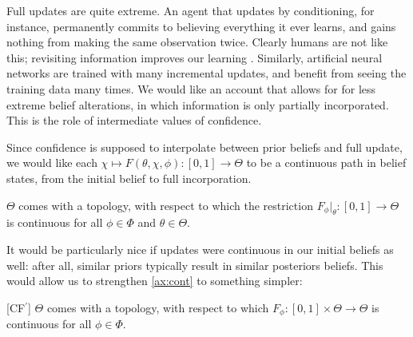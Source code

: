 Full updates are quite extreme.
An agent that updates by conditioning, for instance,
permanently commits to believing everything it ever learns,
and gains nothing from making the same observation twice.
Clearly humans are not like this; revisiting information
 	improves our learning \parencite{ausubel1965effect}.
Similarly, artificial neural networks are trained with
 	many incremental updates, and benefit from seeing 
	the training data many times.
We would like an account that allows for for less extreme belief alterations,
in which information is only partially incorporated.
This is the role of intermediate values of confidence.

Since confidence is supposed to interpolate between prior beliefs and full update,
we would like each $\chi \mapsto F(\theta,\chi,\phi) : [0,1] \to \Theta$
to be a continuous path in belief states, from the initial belief to full incorporation.

\begin{CFaxioms}[nosep]
	\item
	$\Theta$ comes with a topology, with respect to which
	the restriction
	$F_{\phi}|_\theta : [0,1] \to \Theta$
	is continuous
	for all $\phi \in \Phi$ and $\theta \in \Theta$.
	\label{ax:cont}
\end{CFaxioms}



It would be particularly nice if updates were continuous in our initial
beliefs as well: after all, similar priors typically result
in similar posteriors beliefs. This would allow us to strengthen
\cref{ax:cont} to something simpler:

\begin{CFaxioms}[nosep]
	\item
	[CF{\the\numexpr\value{CFaxiomsi}\relax}${^\prime}$]
	$\Theta$ comes with a topology, with respect to which
	$F_\phi : [0,1] \times \Theta \to \Theta$ is continuous
	for all $\phi \in \Phi$.
	\label{ax:cont-strong}
\end{CFaxioms}

